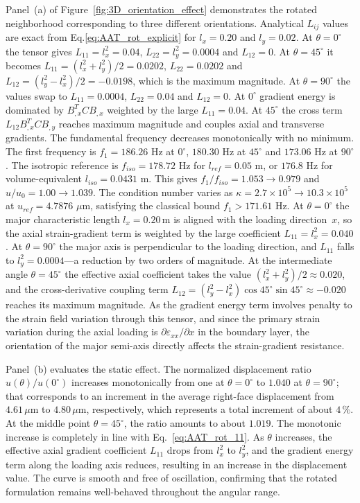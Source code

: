 \documentclass[final,3p,times,fleqn]{elsarticle}
\newcommand{\revtwo}[1]{\textcolor{revtwocolor}{#1}}
\begin{document}
Panel~(a) of Figure~\ref{fig:3D_orientation_effect} demonstrates the 
rotated neighborhood corresponding to three different orientations.
Analytical $L_{ij}$ values are exact from Eq.\ref{eq:AAT_rot_explicit} for $l_x=0.20$ and $l_y=0.02$. At $\theta=0^\circ$ the tensor gives $L_{11}=l_x^2=0.04$, $L_{22}=l_y^2=0.0004$ and $L_{12}=0$. At $\theta=45^\circ$ it becomes $L_{11}=(l_x^2+l_y^2)/2=0.0202$, $L_{22}=0.0202$ and $L_{12}=(l_y^2-l_x^2)/2=-0.0198$, which is the maximum magnitude. At $\theta=90^\circ$ the values swap to $L_{11}=0.0004$, $L_{22}=0.04$ and $L_{12}=0$. At $0^\circ$ gradient energy is dominated by $B_{,x}^T C B_{,x}$ weighted by the large $L_{11}=0.04$. At $45^\circ$ the cross term $L_{12} B_{,x}^T C B_{,y}$ reaches maximum magnitude and couples axial and transverse gradients. \revtwo{The fundamental frequency decreases monotonically with no minimum. }The first frequency is $f_1=186.26$ Hz at $0^\circ$, $180.30$ Hz at $45^\circ$ and $173.06$ Hz at $90^\circ$. The isotropic reference is $f_{iso}=178.72$ Hz for $l_{ref}=0.05$ m, or $176.8$ Hz for volume-equivalent $l_{iso}=0.0431$ m. This gives $f_1/f_{iso}=1.053\to0.979$ and $u/u_0=1.00\to1.039$. The condition number varies as $\kappa=2.7\times10^5\to10.3\times10^5$ at $u_{ref}=4.7876$ $\mu$m, satisfying the classical bound $f_1>171.61$ Hz.
At $\theta = 0^{\circ}$ the major characteristic length $l_{x} = 0.20$\,m is
aligned with the loading direction~$x$, so the axial strain-gradient
term is weighted by the large coefficient
$L_{11} = l_{x}^{2} = 0.040$.
At $\theta = 90^{\circ}$ the major axis is perpendicular to the loading
direction, and $L_{11}$ falls to
$l_{y}^{2} = 0.0004$---a reduction by two orders of magnitude.
At the intermediate angle $\theta = 45^{\circ}$ the effective axial
coefficient takes the value
$(l_{x}^{2}+l_{y}^{2})/2 \approx 0.020$, and the cross-derivative
coupling term
$L_{12}
= (l_{y}^{2}-l_{x}^{2})\cos 45^{\circ}\sin 45^{\circ}
\approx -0.020$
reaches its maximum magnitude.
As the gradient energy term involves penalty to the strain field
variation through this tensor, and since the primary strain variation
during the axial loading is $\partial \varepsilon_{xx} / \partial x$ in the
boundary layer, the orientation of the major semi-axis directly
affects the strain-gradient resistance.

Panel~(b) evaluates the static effect.
The normalized displacement ratio $u(\theta)/u(0^{\circ})$ increases
monotonically from one at $\theta = 0^{\circ}$ to $1.040$ at
$\theta = 90^{\circ}$; that corresponds to an increment in the average
right-face displacement from $4.61\,\mu$m to $4.80\,\mu$m,
respectively, which represents a total increment of about $4\,\%$.
At the middle point $\theta = 45^{\circ}$, the ratio amounts to about $1.019$.
The monotonic increase is completely in line with
Eq.~\eqref{eq:AAT_rot_11}. As $\theta$ increases, the effective axial gradient coefficient $L_{11}$
drops from $l_{x}^{2}$ to $l_{y}^{2}$, and the gradient energy term along the loading axis reduces, resulting in an increase in the displacement value.
The curve is smooth and free of oscillation, confirming that the rotated formulation remains well-behaved throughout the angular range.
\end{document}
